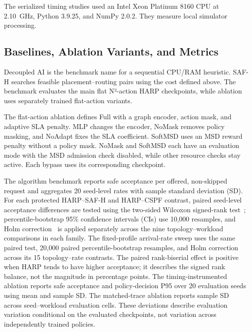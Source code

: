 \documentclass[final,5p]{elsarticle}
\newcommand{\rev}[1]{\textcolor{revisiongreen}{#1}}
\let\newrev\rev
\begin{document}


\newrev{The serialized timing studies used an Intel Xeon Platinum 8160 CPU at 2.10~GHz, Python 3.9.25, and NumPy 2.0.2. They measure local simulator processing.}

\subsection{\newrev{Baselines, Ablation Variants, and Metrics}}
\label{subsec:baselines_metrics}
\newrev{Decoupled AI is the benchmark name for a sequential CPU/RAM heuristic. SAF-H searches feasible placement--routing pairs using the cost defined above. The benchmark evaluates the main flat N²-action HARP checkpoints, while ablation uses separately trained flat-action variants.}

\newrev{The flat-action ablation defines Full with a graph encoder, action mask, and adaptive SLA penalty. MLP changes the encoder, NoMask removes policy masking, and NoAdapt fixes the SLA coefficient. SoftMSD uses an MSD reward penalty without a policy mask. NoMask and SoftMSD each have an evaluation mode with the MSD admission check disabled, while other resource checks stay active. Each bypass uses its corresponding checkpoint.}

\newrev{The algorithm benchmark reports safe acceptance per offered, non-skipped request and aggregates 20 seed-level rates with sample standard deviation (SD). For each protected HARP--SAF-H and HARP--CSPF contrast, paired seed-level acceptance differences are tested using the two-sided Wilcoxon signed-rank test~\cite{wilcoxon1945}; percentile-bootstrap 95\% confidence intervals (CIs) use 10,000 resamples, and Holm correction~\cite{holm1979} is applied separately across the nine topology--workload comparisons in each family. The fixed-profile arrival-rate sweep uses the same paired test, 20,000 paired percentile-bootstrap resamples, and Holm correction across its 15 topology--rate contrasts. The paired rank-biserial effect is positive when HARP tends to have higher acceptance; it describes the signed rank balance, not the magnitude in percentage points. The timing-instrumented ablation reports safe acceptance and policy-decision P95 over 20 evaluation seeds using mean and sample SD. The matched-trace ablation reports sample SD across seed--workload evaluation cells. These deviations describe evaluation variation conditional on the evaluated checkpoints, not variation across independently trained policies.}
\end{document}
